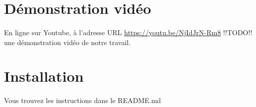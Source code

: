 \documentclass[a4paper]{article}
\begin{document}
        \section*{Démonstration vidéo}
            \paragraph{}
                En ligne sur Youtube, à l'adresse URL \url{https://youtu.be/NjIdJrN-Rm8} !!TODO!! une démonstration vidéo de notre travail.
        \section*{Installation}
            \paragraph{}
                Vous trouvez les instructions dans le README.md
\end{document}
